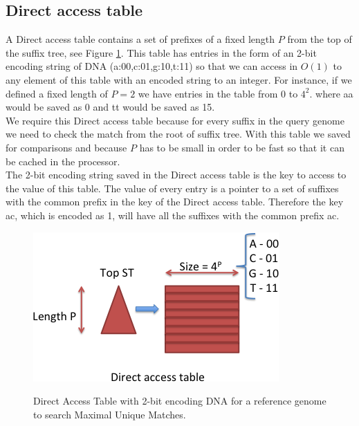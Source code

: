 \documentclass[runningheads,a4paper]{llncs}
\begin{document}
{\subsection{Direct access table}
A Direct access table contains a set of prefixes of a fixed length $P$ from the top of the suffix tree, see Figure \ref{fig:dat}. This table has entries in the form of an 2-bit encoding string of DNA (a:00,c:01,g:10,t:11) so that we can access in $O(1)$ to any element of this table with an encoded string to an integer. For instance, if we defined a fixed length of $P=2$ we have entries in the table from 0 to $4^2$. where aa would be saved as 0 and tt would be saved as 15.\\
We require this Direct access table because for every suffix in the query genome we need to check the match from the root of suffix tree. With this table we saved for comparisons and because $P$ has to be small in order to be fast so that it can be cached in the processor.\\
The 2-bit encoding string saved in the Direct access table is the key to access to the value of this table. The value of every entry is a pointer to a set of suffixes with the common prefix in the key of the Direct access table. Therefore the key ac, which is encoded as 1, will have all the suffixes with the common prefix ac.
\begin{figure}
\centering
\includegraphics[scale=0.5]{DAT.png}
\label{fig:dat}
\caption{Direct Access Table with 2-bit encoding DNA for a reference genome to search Maximal Unique Matches.}
\end{figure}
}
\end{document}
